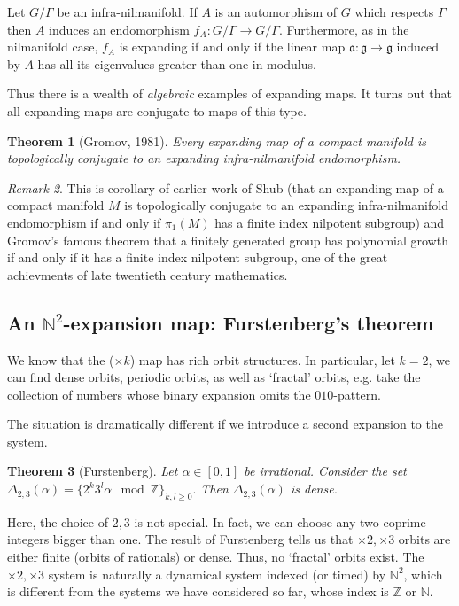 \documentclass[12pt]{article}
\newtheorem{theorem}{Theorem}[section]
\theoremstyle{definition}
\theoremstyle{remark}
\newtheorem{remark}[theorem]{Remark}
\begin{document}
Let $G/\Gamma$ be an infra-nilmanifold. If $A$ is an automorphism of $G$ which respects $\Gamma$
then $A$ induces an endomorphism $f_A : G/\Gamma \to G/\Gamma$. Furthermore, as in the nilmanifold case, $f_A$ is expanding 
if and only if the linear map $\mathfrak a : \mathfrak g \to \mathfrak g$ induced by $A$ has all its eigenvalues 
greater than one in modulus. 

Thus there is a wealth of {\it algebraic} examples of expanding maps.
It turns out that all expanding maps are conjugate to maps of this type.



\begin{theorem}[Gromov, 1981] 
Every expanding map of a compact manifold is topologically conjugate to an expanding infra-nilmanifold endomorphism.
\end{theorem}

\begin{remark}
This is corollary of earlier work of Shub (that an expanding map of a compact manifold $M$ is topologically conjugate to an expanding infra-nilmanifold endomorphism if and only if $\pi_1(M)$ has a finite index nilpotent subgroup)
and Gromov's famous theorem that a finitely generated group has polynomial growth if and only
if it has a finite index nilpotent subgroup, one of the great achievments of late twentieth 
century mathematics.
\end{remark}
\subsection{An $\mathbb{N}^2$-expansion map: Furstenberg's theorem}
We know that the ($\times k$) map has rich orbit structures. In particular, let $k=2$, we can find dense orbits, periodic orbits, as well as `fractal' orbits, e.g. take the collection of numbers whose binary expansion omits the $010$-pattern.

The situation is dramatically different if we introduce a second expansion to the system.

\begin{theorem}[Furstenberg]
    Let $\alpha\in [0,1]$ be irrational. Consider the set $\Delta_{2,3}(\alpha)=\{2^k3^l\alpha\mod \mathbb{Z}\}_{k,l\geq 0}.$ Then $\Delta_{2,3}(\alpha)$ is dense.
\end{theorem}
Here, the choice of $2,3$ is not special. In fact, we can choose any two coprime integers bigger than one. The result of Furstenberg tells us that $\times 2, \times 3$ orbits are either finite (orbits of rationals) or dense. Thus, no `fractal' orbits exist. The $\times 2, \times 3$ system is naturally a dynamical system indexed (or timed) by $\mathbb{N}^2$, which is different from the systems we have considered so far, whose index is $\mathbb{Z}$ or $\mathbb{N}$.
\end{document}
